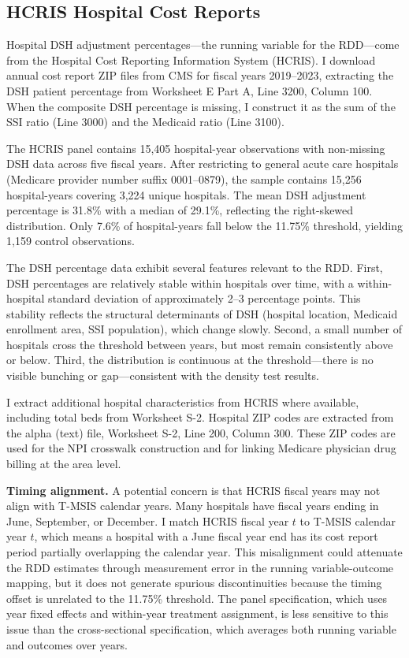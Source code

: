 \documentclass[12pt]{article}
\begin{document}
\subsection{HCRIS Hospital Cost Reports}
\label{sec:hcris}

Hospital DSH adjustment percentages---the running variable for the RDD---come from the Hospital Cost Reporting Information System (HCRIS). I download annual cost report ZIP files from CMS for fiscal years 2019--2023, extracting the DSH patient percentage from Worksheet E Part A, Line 3200, Column 100. When the composite DSH percentage is missing, I construct it as the sum of the SSI ratio (Line 3000) and the Medicaid ratio (Line 3100).

The HCRIS panel contains 15,405 hospital-year observations with non-missing DSH data across five fiscal years. After restricting to general acute care hospitals (Medicare provider number suffix 0001--0879), the sample contains 15,256 hospital-years covering 3,224 unique hospitals. The mean DSH adjustment percentage is 31.8\% with a median of 29.1\%, reflecting the right-skewed distribution. Only 7.6\% of hospital-years fall below the 11.75\% threshold, yielding 1,159 control observations.

The DSH percentage data exhibit several features relevant to the RDD. First, DSH percentages are relatively stable within hospitals over time, with a within-hospital standard deviation of approximately 2--3 percentage points. This stability reflects the structural determinants of DSH (hospital location, Medicaid enrollment area, SSI population), which change slowly. Second, a small number of hospitals cross the threshold between years, but most remain consistently above or below. Third, the distribution is continuous at the threshold---there is no visible bunching or gap---consistent with the density test results.

I extract additional hospital characteristics from HCRIS where available, including total beds from Worksheet S-2. Hospital ZIP codes are extracted from the alpha (text) file, Worksheet S-2, Line 200, Column 300. These ZIP codes are used for the NPI crosswalk construction and for linking Medicare physician drug billing at the area level.

\textbf{Timing alignment.} A potential concern is that HCRIS fiscal years may not align with T-MSIS calendar years. Many hospitals have fiscal years ending in June, September, or December. I match HCRIS fiscal year $t$ to T-MSIS calendar year $t$, which means a hospital with a June fiscal year end has its cost report period partially overlapping the calendar year. This misalignment could attenuate the RDD estimates through measurement error in the running variable-outcome mapping, but it does not generate spurious discontinuities because the timing offset is unrelated to the 11.75\% threshold. The panel specification, which uses year fixed effects and within-year treatment assignment, is less sensitive to this issue than the cross-sectional specification, which averages both running variable and outcomes over years.
\end{document}
